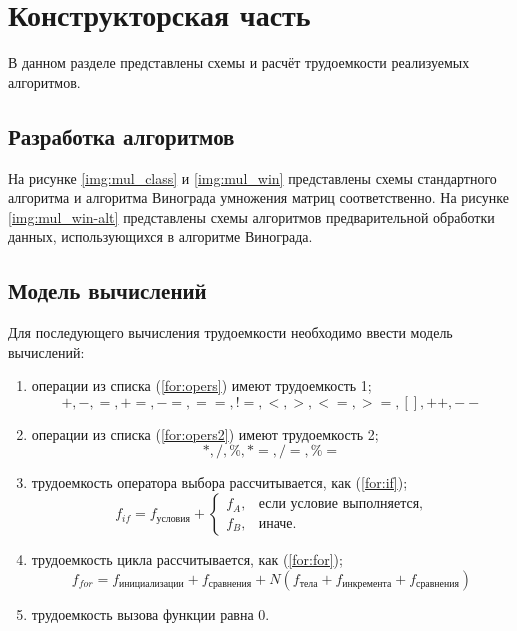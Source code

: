 \chapter{Конструкторская часть}

В данном разделе представлены схемы и расчёт трудоемкости реализуемых алгоритмов.

\section{Разработка алгоритмов}

На рисунке \ref{img:mul_class} и \ref{img:mul_win} представлены схемы стандартного алгоритма и алгоритма Винограда умножения матриц соответственно.
На рисунке \ref{img:mul_win-alt} представлены схемы алгоритмов предварительной обработки данных, использующихся в алгоритме Винограда.

\clearpage
{}
\clearpage
{}
\clearpage

\section{Модель вычислений}

Для последующего вычисления трудоемкости необходимо ввести модель вычислений:
\begin{enumerate}
    \item операции из списка (\ref{for:opers}) имеют трудоемкость 1;
        \begin{equation}
            \label{for:opers}
            +, -, =, +=, -=, ==, !=, <, >, <=, >=, [], ++, {-}-
        \end{equation}
    \item операции из списка (\ref{for:opers2}) имеют трудоемкость 2;
        \begin{equation}
            \label{for:opers2}
            *, /, \%, *=, /=, \%=
        \end{equation}
    \item трудоемкость оператора выбора  рассчитывается, как (\ref{for:if});
        \begin{equation}
            \label{for:if}
            f_{if} = f_{\text{условия}} +
            \begin{cases}
            f_A, & \text{если условие выполняется,}\\
            f_B, & \text{иначе.}
            \end{cases}
        \end{equation}
    \item трудоемкость цикла рассчитывается, как (\ref{for:for});
        \begin{equation}
            \label{for:for}
            f_{for} = f_{\text{инициализации}} + f_{\text{сравнения}} + N(f_{\text{тела}} + f_{\text{инкремента}} + f_{\text{сравнения}})
        \end{equation}
	\item трудоемкость вызова функции равна 0.
\end{enumerate}

